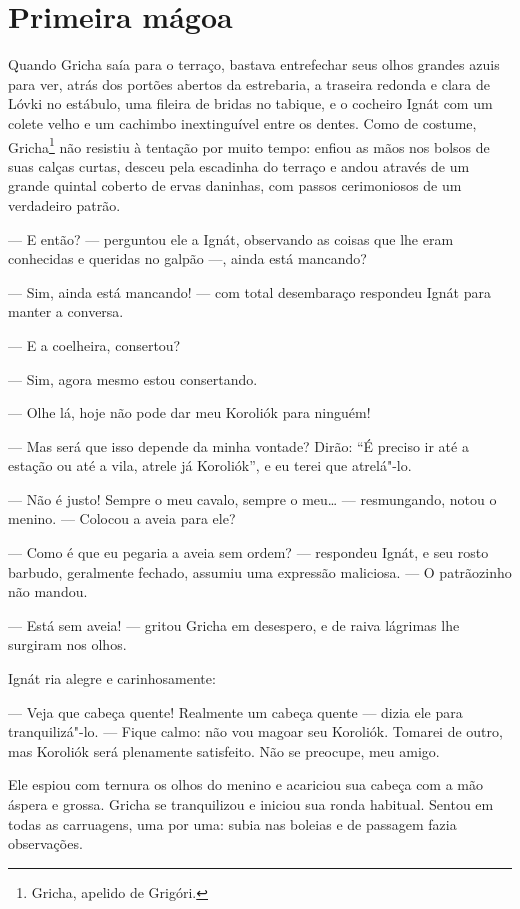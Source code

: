 \chapter{Primeira mágoa} \label{part9}

Quando Gricha saía para o terraço, bastava entrefechar seus olhos
grandes azuis para ver, atrás dos portões abertos da estrebaria, a
traseira redonda e clara de Lóvki no estábulo, uma fileira de bridas no
tabique, e o cocheiro Ignát com um colete velho e um cachimbo
inextinguível entre os dentes. Como de costume, Gricha\footnote{Gricha, apelido de Grigóri.} não resistiu à
tentação por muito tempo: enfiou as mãos nos bolsos de suas calças
curtas, desceu pela escadinha do terraço e andou através de um grande
quintal coberto de ervas daninhas, com passos cerimoniosos de um
verdadeiro patrão.

--- E então? --- perguntou ele a Ignát, observando as coisas que lhe
eram conhecidas e queridas no galpão ---, ainda está mancando?

--- Sim, ainda está mancando! --- com total desembaraço respondeu Ignát
para manter a conversa.

--- E a coelheira, consertou?

--- Sim, agora mesmo estou consertando.

--- Olhe lá, hoje não pode dar meu Koroliók para ninguém!

--- Mas será que isso depende da minha vontade? Dirão: ``É preciso ir
até a estação ou até a vila, atrele já Koroliók'', e eu terei que
atrelá"-lo.

--- Não é justo! Sempre o meu cavalo, sempre o meu\ldots{} --- resmungando,
notou o menino. --- Colocou a aveia para ele?

--- Como é que eu pegaria a aveia sem ordem? --- respondeu Ignát, e seu
rosto barbudo, geralmente fechado, assumiu uma expressão maliciosa. ---
O patrãozinho não mandou.

--- Está sem aveia! --- gritou Gricha em desespero, e de raiva lágrimas
lhe surgiram nos olhos.

Ignát ria alegre e carinhosamente:

--- Veja que cabeça quente! Realmente um cabeça quente --- dizia ele
para tranquilizá"-lo. --- Fique calmo: não vou magoar seu Koroliók.
Tomarei de outro, mas Koroliók será plenamente satisfeito. Não se
preocupe, meu amigo.

Ele espiou com ternura os olhos do menino e acariciou sua cabeça com a
mão áspera e grossa. Gricha se tranquilizou e iniciou sua ronda
habitual. Sentou em todas as carruagens, uma por uma: subia nas boleias
e de passagem fazia observações.


